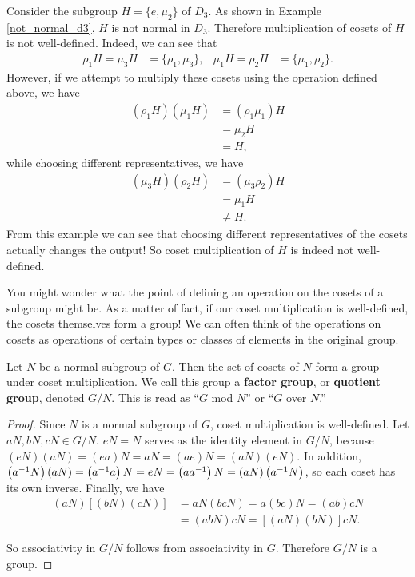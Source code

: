 \begin{example}
Consider the subgroup $H = \{e, \mu_2\}$ of $D_3$. As shown in Example \ref{not_normal_d3}, $H$ is not normal in $D_3$. Therefore multiplication of cosets of $H$ is not well-defined. Indeed, we can see that
\begin{align*}
    \rho_1H = \mu_3H &= \{\rho_1, \mu_3\}, & \mu_1H = \rho_2H &= \{\mu_1, \rho_2\}.
\end{align*}
However, if we attempt to multiply these cosets using the operation defined above, we have
\begin{align*}
    \left(\rho_1H\right)\left(\mu_1H\right) &= \left(\rho_1 \mu_1\right)H \\
    &= \mu_2 H \\
    &= H,
\end{align*}
while choosing different representatives, we have
\begin{align*}
    \left(\mu_3H\right)\left(\rho_2H\right) &= \left(\mu_3 \rho_2\right)H \\
    &= \mu_1 H \\
    &\neq H.
\end{align*}
From this example we can see that choosing different representatives of the cosets actually changes the output! So coset multiplication of $H$ is indeed not well-defined.
\end{example}

You might wonder what the point of defining an operation on the cosets of a subgroup might be. As a matter of fact, if our coset multiplication is well-defined, the cosets themselves form a group! We can often think of the operations on cosets as operations of certain types or classes of elements in the original group.

\begin{theorem}
Let $N$ be a normal subgroup of $G$. Then the set of cosets of $N$ form a group under coset multiplication. We call this group a \textbf{factor group}, or \textbf{quotient group}, denoted $G/N$. This is read as ``$G$ mod $N$'' or ``$G$ over $N$.''
\end{theorem}

\begin{proof}
Since $N$ is a normal subgroup of $G$, coset multiplication is well-defined. Let $aN, bN, cN \in G/N$. $eN = N$ serves as the identity element in $G/N$, because $(eN)(aN) = (ea)N = aN = (ae)N = (aN)(eN)$. In addition, $\left(a^{-1} N\right)(aN) = \left(a^{-1} a\right)N = eN = \left(a a^{-1}\right)N = (aN)\left(a^{-1} N\right)$, so each coset has its own inverse. Finally, we have
\begin{align*}
    (aN)\left[(bN)(cN)\right] &= aN(bcN) = a(bc)N = (ab)cN \\
    &= (abN)cN = \left[(aN)(bN)\right]cN.
\end{align*}

So associativity in $G/N$ follows from associativity in $G$. Therefore $G/N$ is a group.

\end{proof}

